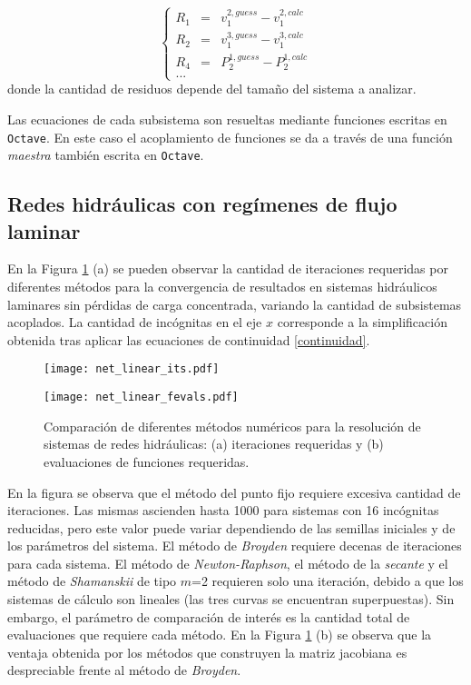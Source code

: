 \begin{equation}
\left \{
\begin{array}{rcl}
R_1 &=& v_1^{2,guess} - v_1^{2,calc} \\
R_2 &=& v_1^{3,guess} - v_1^{3,calc} \\
R_4 &=& P_2^{1,guess} - P_2^{1,calc} \\
...
\end{array}
\right .
\end{equation}
donde la cantidad de residuos depende del tamaño del sistema a analizar.

Las ecuaciones de cada subsistema son resueltas mediante funciones escritas en \texttt{Octave}.
En este caso el acoplamiento de funciones se da a través de una función \textit{maestra} también escrita en \texttt{Octave}.

\subsection*{Redes hidráulicas con regímenes de flujo laminar}
\label{laminar}

En la Figura \ref{net_linear} (a) se pueden observar la cantidad de iteraciones requeridas por diferentes métodos para la convergencia de resultados
en sistemas hidráulicos laminares sin pérdidas de carga concentrada,
variando la cantidad de subsistemas acoplados.
La cantidad de incógnitas en el eje $x$ corresponde a la simplificación obtenida tras aplicar las ecuaciones de continuidad \ref{continuidad}.

\begin{figure}[ht]
	\begin{minipage}{0.5\linewidth}
		\centering
		\texttt{[image: net\_linear\_its.pdf]}
	\end{minipage}
	\begin{minipage}{0.5\linewidth}
		\centering
		\texttt{[image: net\_linear\_fevals.pdf]}
	\end{minipage}
	\caption[Comparación de diferentes métodos numéricos para la resolución de sistemas de redes hidráulicas]
  {Comparación de diferentes métodos numéricos para la resolución de sistemas de redes hidráulicas:
  (a) iteraciones requeridas y (b) evaluaciones de funciones requeridas.}
  \label{net_linear}
\end{figure}

En la figura se observa que el método del punto fijo requiere excesiva cantidad de iteraciones.
Las mismas ascienden hasta 1000 para sistemas con 16 incógnitas reducidas,
pero este valor puede variar dependiendo de las semillas iniciales y de los parámetros del sistema.
El método de \textit{Broyden} requiere decenas de iteraciones para cada sistema.
El método de \textit{Newton-Raphson}, el método de la \textit{secante}
y el método de \textit{Shamanskii} de tipo $m$=2
requieren solo una iteración, debido a que los sistemas de cálculo son lineales
(las tres curvas se encuentran superpuestas).
Sin embargo, el parámetro de comparación de interés es la cantidad total de evaluaciones que requiere cada método.
En la Figura \ref{net_linear} (b) se observa que la ventaja obtenida por los métodos que construyen la matriz jacobiana es despreciable frente al método de \textit{Broyden}.

